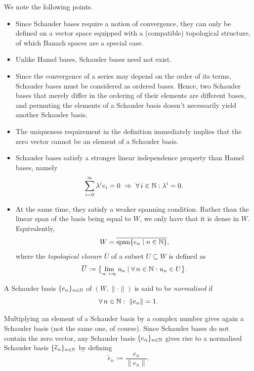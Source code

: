 \noindent We note the following points.
\begin{itemize}
\item Since Schauder bases require a notion of convergence, they can
  only be defined on a vector space equipped with a (compatible)
  topological structure, of which Banach spaces are a special case.
\item Unlike Hamel bases, Schauder bases need not exist.
\item Since the convergence of a series may depend on the order of its
  terms, Schauder bases must be considered as ordered bases. Hence,
  two Schauder bases that merely differ in the ordering of their
  elements are different bases, and permuting the elements of a
  Schauder basis doesn't necessarily yield another Schauder basis.
\item The uniqueness requirement in the definition immediately implies
  that the zero vector cannot be an element of a Schauder basis. 
\item Schauder bases satisfy a stronger linear independence property
  than Hamel bases, namely
\begin{equation*}
\sum_{i=0}^{\infty}\lambda^ie_i = 0 \ \Rightarrow \ \forall \, i\in \mathbb{N}:\lambda^i = 0.
\end{equation*}
\item At the same time, they satisfy a weaker spanning condition.
  Rather than the linear span of the basis being equal to $W$, we only
  have that it is dense in $W$. Equivalently,
\begin{equation*}
W = \overline{\operatorname{span}\{e_n\mid n\in \mathbb{N}\}} ,
\end{equation*}
where the \emph{topological closure} $\overline{U}$ of a subset $U\subseteq W$ is defined as
\begin{equation*}
\overline{U} := \bigl\{ \lim_{n\to\infty}u_n \mid \forall \, n \in \mathbb{N} : u_n\in U \bigr\}.
\end{equation*}
\end{itemize}

\begin{definition}
A Schauder basis $\{e_n\}_{n\in \mathbb{N}}$ of $(W,\|\cdot\|)$ is said to be
\emph{normalised} if
\begin{equation*}
\forall \, n\in \mathbb{N} : \ \|e_n\|=1.
\end{equation*}
\end{definition}

Multiplying an element of a Schauder basis by a complex number gives
again a Schauder basis (not the same one, of course). Since Schauder
bases do not contain the zero vector, any Schauder basis
$\{e_n\}_{n\in \mathbb{N}}$ gives rise to a normalised Schauder basis
$\{\widetilde e_n\}_{n\in \mathbb{N}}$ by defining
\begin{equation*}
\widetilde e_n := \frac{e_n}{\|e_n\|}.
\end{equation*}

